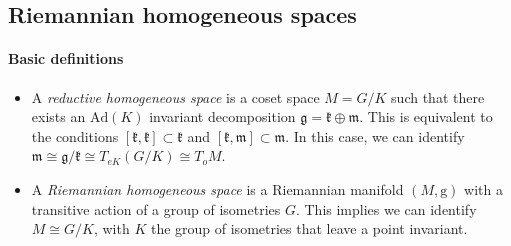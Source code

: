 \documentclass[11pt,a4paper]{article}
\def\rg{{\mathrm{g}}}
\begin{document}
    \subsection{Riemannian homogeneous spaces}\label{apmath}
    
    \paragraph{Basic definitions}
    \begin{itemize}
    	\item A {\it reductive homogeneous space} is a coset space $M=G/K$ such that there exists an $\mathrm{Ad}(K)$ invariant decomposition $\mathfrak{g}=\mathfrak{k}\oplus \mathfrak{m}$. This is equivalent to the conditions $[\mathfrak{k},\mathfrak{k}]\subset\mathfrak{k}$ and $[\mathfrak{k},\mathfrak{m}]\subset\mathfrak{m}$. In this case, we can identify $\mathfrak{m}\cong \mathfrak{g}/\mathfrak{k}\cong T_{eK}(G/K)\cong T_oM$.
    	\item A {\it Riemannian homogeneous space} is a Riemannian manifold $(M, \rg)$ with a transitive action of a group of isometries $G$. This implies we can identify $M\cong G/K$, with $K$ the group of isometries that leave a point invariant.
    \end{itemize}
    
    
    
    
\end{document}

